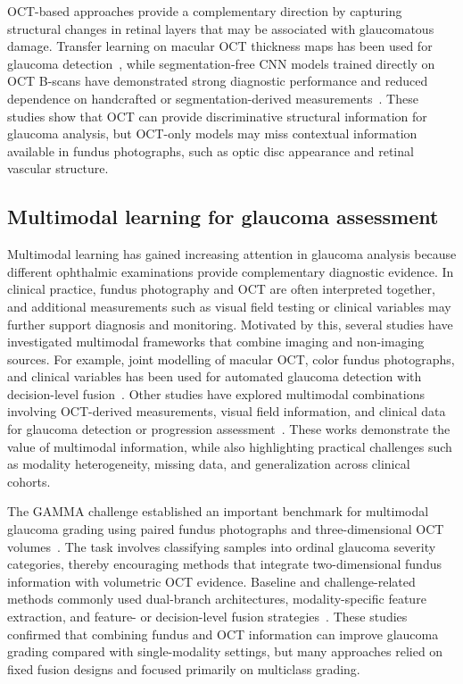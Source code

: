 \documentclass[preprint,12pt]{elsarticle}
\begin{document}
OCT-based approaches provide a complementary direction by capturing structural changes in retinal layers that may be associated with glaucomatous damage. Transfer learning on macular OCT thickness maps has been used for glaucoma detection~\cite{asaoka2019using}, while segmentation-free CNN models trained directly on OCT B-scans have demonstrated strong diagnostic performance and reduced dependence on handcrafted or segmentation-derived measurements~\cite{thompson2020assessment}. These studies show that OCT can provide discriminative structural information for glaucoma analysis, but OCT-only models may miss contextual information available in fundus photographs, such as optic disc appearance and retinal vascular structure.

\subsection{Multimodal learning for glaucoma assessment}
\label{subsec:multimodal_glaucoma_learning}

Multimodal learning has gained increasing attention in glaucoma analysis because different ophthalmic examinations provide complementary diagnostic evidence. In clinical practice, fundus photography and OCT are often interpreted together, and additional measurements such as visual field testing or clinical variables may further support diagnosis and monitoring. Motivated by this, several studies have investigated multimodal frameworks that combine imaging and non-imaging sources. For example, joint modelling of macular OCT, color fundus photographs, and clinical variables has been used for automated glaucoma detection with decision-level fusion~\cite{mehta2021automated}. Other studies have explored multimodal combinations involving OCT-derived measurements, visual field information, and clinical data for glaucoma detection or progression assessment~\cite{luo2023harvard,hwang2025utilization,lim2022use}. These works demonstrate the value of multimodal information, while also highlighting practical challenges such as modality heterogeneity, missing data, and generalization across clinical cohorts.

The GAMMA challenge established an important benchmark for multimodal glaucoma grading using paired fundus photographs and three-dimensional OCT volumes~\cite{wu2023gamma}. The task involves classifying samples into ordinal glaucoma severity categories, thereby encouraging methods that integrate two-dimensional fundus information with volumetric OCT evidence. Baseline and challenge-related methods commonly used dual-branch architectures, modality-specific feature extraction, and feature- or decision-level fusion strategies~\cite{wu2023gamma}. These studies confirmed that combining fundus and OCT information can improve glaucoma grading compared with single-modality settings, but many approaches relied on fixed fusion designs and focused primarily on multiclass grading.
\end{document}
